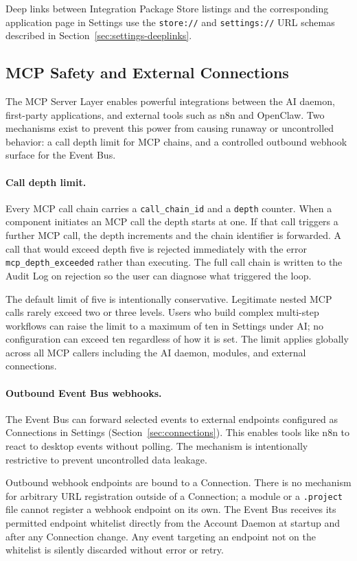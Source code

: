 Deep links between Integration Package Store listings and the corresponding
application page in Settings use the \texttt{store://} and \texttt{settings://}
URL schemas described in Section~\ref{sec:settings-deeplinks}.

\subsection{MCP Safety and External Connections}
\label{sec:mcp-safety}

The MCP Server Layer enables powerful integrations between the AI daemon,
first-party applications, and external tools such as n8n and OpenClaw. Two
mechanisms exist to prevent this power from causing runaway or uncontrolled
behavior: a call depth limit for MCP chains, and a controlled outbound webhook
surface for the Event Bus.

\paragraph{Call depth limit.}
Every MCP call chain carries a \texttt{call\_chain\_id} and a \texttt{depth}
counter. When a component initiates an MCP call the depth starts at one. If
that call triggers a further MCP call, the depth increments and the chain
identifier is forwarded. A call that would exceed depth five is rejected
immediately with the error \texttt{mcp\_depth\_exceeded} rather than
executing. The full call chain is written to the Audit Log on rejection so
the user can diagnose what triggered the loop.

The default limit of five is intentionally conservative. Legitimate nested
MCP calls rarely exceed two or three levels. Users who build complex
multi-step workflows can raise the limit to a maximum of ten in Settings under
AI; no configuration can exceed ten regardless of how it is set. The limit
applies globally across all MCP callers including the AI daemon, modules, and
external connections.

\paragraph{Outbound Event Bus webhooks.}
The Event Bus can forward selected events to external endpoints configured as
Connections in Settings (Section~\ref{sec:connections}). This enables tools
like n8n to react to desktop events without polling. The mechanism is
intentionally restrictive to prevent uncontrolled data leakage.

Outbound webhook endpoints are bound to a Connection. There is no mechanism
for arbitrary URL registration outside of a Connection; a module or a
\texttt{.project} file cannot register a webhook endpoint on its own. The
Event Bus receives its permitted endpoint whitelist directly from the Account
Daemon at startup and after any Connection change. Any event targeting an
endpoint not on the whitelist is silently discarded without error or retry.

